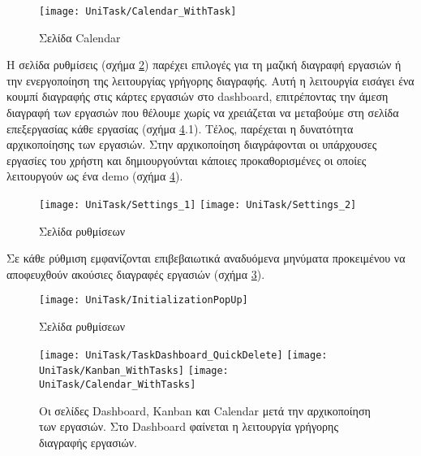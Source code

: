         \begin{figure}[h!] \noindent \centering
            \texttt{[image: UniTask/Calendar\_WithTask]}
            \caption{\centering Σελίδα Calendar}
            \label{fig:unitask_Calendar_WithTask}
        \end{figure}

        Η σελίδα {\ZonaSB ρυθμίσεις} (σχήμα \ref{fig:unitask_Settings}) παρέχει επιλογές για τη μαζική διαγραφή εργασιών ή την ενεργοποίηση της λειτουργίας γρήγορης διαγραφής. Αυτή η λειτουργία εισάγει ένα κουμπί διαγραφής στις κάρτες εργασιών στο dashboard, επιτρέποντας την άμεση διαγραφή των εργασιών που θέλουμε χωρίς να χρειάζεται να μεταβούμε στη σελίδα επεξεργασίας κάθε εργασίας (σχήμα \ref{fig:unitask_Dashboard_Kanban_Calendar_WithTasks}.1). Τέλος, παρέχεται η δυνατότητα αρχικοποίησης των εργασιών. Στην αρχικοποίηση διαγράφονται οι υπάρχουσες εργασίες του χρήστη και δημιουργούνται κάποιες προκαθορισμένες οι οποίες λειτουργούν ως ένα demo (σχήμα \ref{fig:unitask_Dashboard_Kanban_Calendar_WithTasks}).

        \begin{figure}[h!] \noindent \centering
            \texttt{[image: UniTask/Settings\_1]}
            \texttt{[image: UniTask/Settings\_2]}
            \caption{\centering Σελίδα ρυθμίσεων}
            \label{fig:unitask_Settings}
        \end{figure}

        Σε κάθε ρύθμιση εμφανίζονται επιβεβαιωτικά αναδυόμενα μηνύματα προκειμένου να αποφευχθούν ακούσιες διαγραφές εργασιών (σχήμα \ref{fig:unitask_InitializationPopUp}).

        \begin{figure}[h!] \noindent \centering
            \texttt{[image: UniTask/InitializationPopUp]}
            \caption{\centering Σελίδα ρυθμίσεων}
            \label{fig:unitask_InitializationPopUp}
        \end{figure}

        \begin{figure}[p!] \noindent \centering
            \texttt{[image: UniTask/TaskDashboard\_QuickDelete]}
            \texttt{[image: UniTask/Kanban\_WithTasks]}
            \texttt{[image: UniTask/Calendar\_WithTasks]}
            \caption{\centering Οι σελίδες Dashboard, Kanban και Calendar μετά την αρχικοποίηση των εργασιών. Στο Dashboard φαίνεται η λειτουργία γρήγορης διαγραφής εργασιών.}
            \label{fig:unitask_Dashboard_Kanban_Calendar_WithTasks}
        \end{figure}

